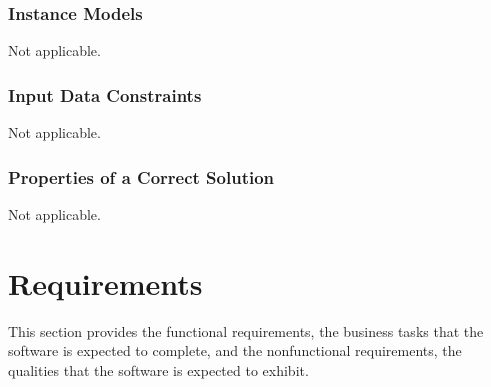 \documentclass[12pt]{article}
\begin{document}
\subsubsection{Instance Models} \label{sec_instance}    
Not applicable.

\subsubsection{Input Data Constraints} \label{sec_DataConstraints}    
Not applicable.

\subsubsection{Properties of a Correct Solution} \label{sec_CorrectSolution} Not
applicable.


\newpage


\section{Requirements}

This section provides the functional requirements, the business tasks that the
software is expected to complete, and the nonfunctional requirements, the
qualities that the software is expected to exhibit.
\end{document}
